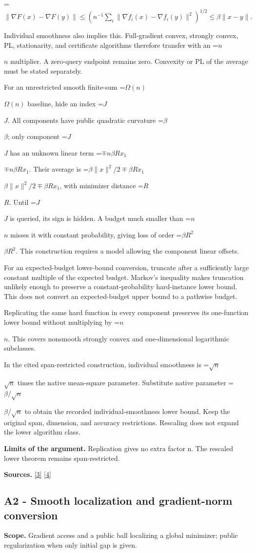 \documentclass[10pt,a4paper]{article}
\newcommand{\AtlasMath}[1]{\par\begingroup\centering\setbox0=\hbox{$\displaystyle #1$}\ifdim\wd0>1.4\linewidth\typeout{ATLAS WIDE FORMULA: \the\wd0}\fi\ifdim\wd0>\linewidth\resizebox{\linewidth}{!}{\box0}\else\box0\fi\par\endgroup}
\newcommand{\AtlasInlineMath}[1]{\begingroup\setbox0=\hbox{$#1$}\ifdim\wd0>.4\linewidth\endgroup\AtlasMath{#1}\else\endgroup$#1$\fi}
\begin{document}
\AtlasMath{\|\nabla F(x)-\nabla F(y)\|
\le(n^{-1}\sum_i\|\nabla f_i(x)-\nabla f_i(y)\|^2)^{1/2}
\le\beta\|x-y\|.}

Individual smoothness also implies this. Full-gradient convex, strongly convex, PL, stationarity, and certificate algorithms therefore transfer with an \AtlasInlineMath{n} multiplier. A zero-query endpoint remains zero. Convexity or PL of the average must be stated separately.

For an unrestricted smooth finite-sum \AtlasInlineMath{\Omega(n)} baseline, hide an index \AtlasInlineMath{J}. All components have public quadratic curvature \AtlasInlineMath{\beta}; only component \AtlasInlineMath{J} has an unknown linear term \AtlasInlineMath{\mp n\beta R x_1}. Their average is
\AtlasInlineMath{\beta\|x\|^2/2\mp\beta Rx_1}, with minimizer distance \AtlasInlineMath{R}. Until \AtlasInlineMath{J} is queried, its sign is hidden. A budget much smaller than \AtlasInlineMath{n} misses it with constant probability, giving loss of order \AtlasInlineMath{\beta R^2}. This construction requires a model allowing the component linear offsets.

For an expected-budget lower-bound conversion, truncate after a sufficiently large constant multiple of the expected budget. Markov's inequality makes truncation unlikely enough to preserve a constant-probability hard-instance lower bound. This does not convert an expected-budget upper bound to a pathwise budget.

Replicating the same hard function in every component preserves its one-function lower bound without multiplying by \AtlasInlineMath{n}. This covers nonsmooth strongly convex and one-dimensional logarithmic subclasses.

In the cited span-restricted construction, individual smoothness is \AtlasInlineMath{\sqrt n} times the native mean-square parameter. Substitute native parameter \AtlasInlineMath{\beta/\sqrt n} to obtain the recorded individual-smoothness lower bound. Keep the original span, dimension, and accuracy restrictions. Rescaling does not expand the lower algorithm class.

\textbf{Limits of the argument.} Replication gives no extra factor n. The rescaled lower theorem remains span-restricted.

\textbf{Sources.} \href{https://proceedings.mlr.press/v97/zhou19b/zhou19b.pdf}{[3]} \href{https://arxiv.org/pdf/1405.4980}{[4]}

\subsection{A2 - Smooth localization and gradient-norm conversion}
\textbf{Scope.} Gradient access and a public ball localizing a global minimizer; public regularization when only initial gap is given.
\end{document}
